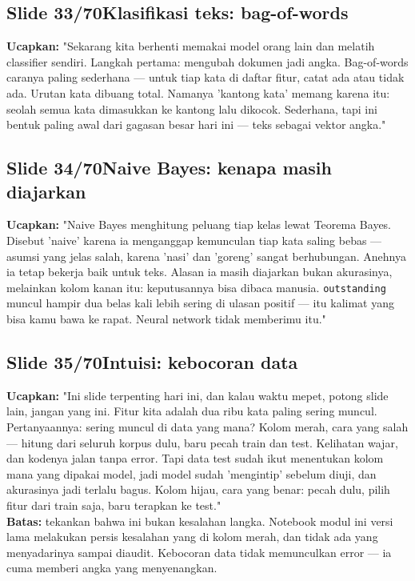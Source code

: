 \documentclass[11pt]{article}
\renewcommand{\framebox}[1]{\colorbox{acc!15}{\textcolor{acc}{\textbf{#1}}}}
\begin{document}
\subsection*{\framebox{Slide 33/70}\quad Klasifikasi teks: bag-of-words}
\textbf{Ucapkan:} "Sekarang kita berhenti memakai model orang lain dan melatih classifier sendiri. Langkah pertama: mengubah dokumen jadi angka. Bag-of-words caranya paling sederhana — untuk tiap kata di daftar fitur, catat ada atau tidak ada. Urutan kata dibuang total. Namanya 'kantong kata' memang karena itu: seolah semua kata dimasukkan ke kantong lalu dikocok. Sederhana, tapi ini bentuk paling awal dari gagasan besar hari ini — teks sebagai vektor angka."\\[2pt]

\subsection*{\framebox{Slide 34/70}\quad Naive Bayes: kenapa masih diajarkan}
\textbf{Ucapkan:} "Naive Bayes menghitung peluang tiap kelas lewat Teorema Bayes. Disebut 'naive' karena ia menganggap kemunculan tiap kata saling bebas — asumsi yang jelas salah, karena 'nasi' dan 'goreng' sangat berhubungan. Anehnya ia tetap bekerja baik untuk teks. Alasan ia masih diajarkan bukan akurasinya, melainkan kolom kanan itu: keputusannya bisa dibaca manusia. \texttt{outstanding} muncul hampir dua belas kali lebih sering di ulasan positif — itu kalimat yang bisa kamu bawa ke rapat. Neural network tidak memberimu itu."\\[2pt]

\subsection*{\framebox{Slide 35/70}\quad Intuisi: kebocoran data}
\textbf{Ucapkan:} "Ini slide terpenting hari ini, dan kalau waktu mepet, potong slide lain, jangan yang ini. Fitur kita adalah dua ribu kata paling sering muncul. Pertanyaannya: sering muncul di data yang mana? Kolom merah, cara yang salah — hitung dari seluruh korpus dulu, baru pecah train dan test. Kelihatan wajar, dan kodenya jalan tanpa error. Tapi data test sudah ikut menentukan kolom mana yang dipakai model, jadi model sudah 'mengintip' sebelum diuji, dan akurasinya jadi terlalu bagus. Kolom hijau, cara yang benar: pecah dulu, pilih fitur dari train saja, baru terapkan ke test."\\[2pt]
\textbf{Batas:} tekankan bahwa ini bukan kesalahan langka. Notebook modul ini versi lama melakukan persis kesalahan yang di kolom merah, dan tidak ada yang menyadarinya sampai diaudit. Kebocoran data tidak memunculkan error — ia cuma memberi angka yang menyenangkan.\\[2pt]
\end{document}
